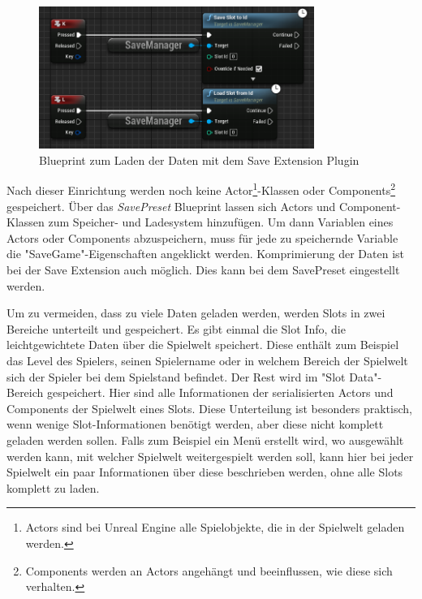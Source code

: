 \begin{figure}[htp]
    \centering
    \includegraphics[width=0.8\textwidth]{images/SaveExtension_load_save_blueprint.png}
    \caption{Blueprint zum Laden der Daten mit dem Save Extension Plugin\cite{piperiftPiperiftSaveBlueprint}}
    \label{fig:unrealSaveExtensionBlueprint}
\end{figure}

Nach dieser Einrichtung werden noch keine Actor\footnote{Actors sind bei Unreal Engine alle Spielobjekte, die in der Spielwelt geladen werden.\cite{unrealengineActors}}-Klassen oder Components\footnote{Components werden an Actors angehängt und beeinflussen, wie diese sich verhalten.\cite{unrealengineActors}} gespeichert. Über das \textit{SavePreset} Blueprint lassen sich Actors und Component-Klassen zum Speicher- und Ladesystem hinzufügen. Um dann Variablen eines Actors oder Components abzuspeichern, muss für jede zu speichernde Variable die "SaveGame"-Eigenschaften angeklickt werden. Komprimierung der Daten ist bei der Save Extension auch möglich. Dies kann bei dem SavePreset eingestellt werden.

Um zu vermeiden, dass zu viele Daten geladen werden, werden Slots in zwei Bereiche unterteilt und gespeichert. Es gibt einmal die Slot Info, die leichtgewichtete Daten über die Spielwelt speichert. Diese enthält zum Beispiel das Level des Spielers, seinen Spielername oder in welchem Bereich der Spielwelt sich der Spieler bei dem Spielstand befindet. Der Rest wird im "Slot Data"-Bereich gespeichert. Hier sind alle Informationen der serialisierten Actors und Components der Spielwelt eines Slots. Diese Unterteilung ist besonders praktisch, wenn wenige Slot-Informationen benötigt werden, aber diese nicht komplett geladen werden sollen. Falls zum Beispiel ein Menü erstellt wird, wo ausgewählt werden kann, mit welcher Spielwelt weitergespielt werden soll, kann hier bei jeder Spielwelt ein paar Informationen über diese beschrieben werden, ohne alle Slots komplett zu laden.\cite{piperiftPiperiftSaveSlot}

